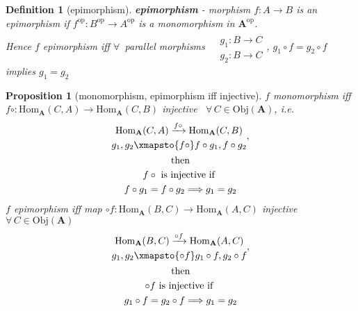 \documentclass[10pt]{amsart}
\newtheorem{proposition}{Proposition}
\newtheorem{definition}{Definition}
\begin{document}
\begin{multicols*}{2}
\begin{definition}[epimorphism]
\textbf{epimorphism} - morphism $f:A \to B$ is an epimorphism if $f^{\text{op}} : B^{\text{op}} \to A^{\text{op}}$ is a monomorphism in $\mathbf{A}^{\text{op}}$. \\
Hence $f$ epimorphism iff $\forall \, $ parallel morphisms $\begin{aligned} & \quad \\ 
	& g_1 : B \to C \\
	& g_2 : B\to C\end{aligned}$, $g_1 \circ f = g_2 \circ f $ \\
	 implies $g_1 = g_2$
\end{definition}

\begin{proposition}[monomorphism, epimorphism iff injective]
	$f$ monomorphism iff $f \circ : \text{Hom}_{\mathbf{A}}(C,A) \to \text{Hom}_{\mathbf{A}}(C,B)$ injective \, $\forall \, C \in \text{Obj}(\mathbf{A})$, i.e.
	\begin{equation}
	\begin{gathered}
\begin{gathered} 
	\text{Hom}_{\mathbf{A}}(C, A) \xrightarrow{f \circ } \text{Hom}_{\mathbf{A}}(C,B) \\
 g_1 , g_2 \xmapsto{f \circ} f\circ g_1 , f\circ g_2
\end{gathered}, \\ \text{ then } \\
f \circ \text{ is injective if } \\
	f \circ g_1 = f \circ g_2 \Longrightarrow g_1 = g_2
\end{gathered} 
	\end{equation}
$f$ epimorphism iff map $\circ f : \text{Hom}_{\mathbf{A}}(B,C) \to \text{Hom}_{\mathbf{A}}(A,C)$ injective $\forall \, C \in \text{Obj}(\mathbf{A})$
\begin{equation}
\begin{gathered}
\begin{gathered} 
\text{Hom}_{\mathbf{A}}(B, C) \xrightarrow{\circ f} \text{Hom}_{\mathbf{A}}(A,C) \\
g_1 , g_2  \xmapsto{ \circ f} g_1\circ f , g_2 \circ f
\end{gathered}, \\ \text{ then } \\
\circ f \text{ is injective if } \\ 
g_1 \circ f = g_2 \circ f \Longrightarrow g_1 = g_2
\end{gathered}
\end{equation}
\end{proposition}


\end{multicols*}
\end{document}
